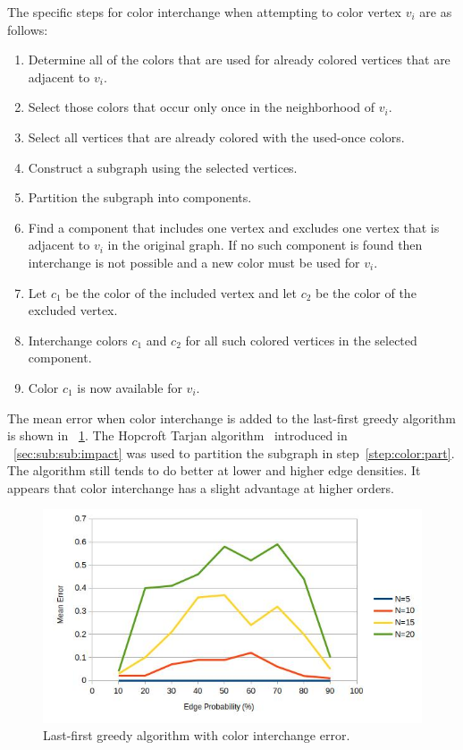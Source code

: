 The specific steps for color interchange when attempting to color vertex \(v_i\) are as follows:
\begin{enumerate}
\item Determine all of the colors that are used for already colored vertices that are adjacent to \(v_i\).
\item Select those colors that occur only once in the neighborhood of \(v_i\).
\item Select all vertices that are already colored with the used-once colors.
\item Construct a subgraph using the selected vertices.
\item\label{step:color:part} Partition the subgraph into components.
\item Find a component that includes one vertex and excludes one vertex that is adjacent to \(v_i\) in the original
  graph.  If no such component is found then interchange is not possible and a new color must be used for \(v_i\).
\item Let \(c_1\) be the color of the included vertex and let \(c_2\) be the color of the excluded vertex.
\item Interchange colors \(c_1\) and \(c_2\) for all such colored vertices in the selected component.
\item Color \(c_1\) is now available for \(v_i\).
\end{enumerate}

The mean error when color interchange is added to the last-first greedy algorithm is shown in
\figurename~\ref{fig:greedyint:error}.  The Hopcroft Tarjan algorithm~\cite{hopcroft} introduced in
\sectionname~\ref{sec:sub:sub:impact} was used to partition the subgraph in step~\ref{step:color:part}.  The
algorithm still tends to do better at lower and higher edge densities.  It appears that color interchange has a
slight advantage at higher orders.

\begin{figure}[H]
  \centering
  \includegraphics[width=5in]{greedyint_error}
  \caption{Last-first greedy algorithm with color interchange error.}
  \label{fig:greedyint:error}
\end{figure}

